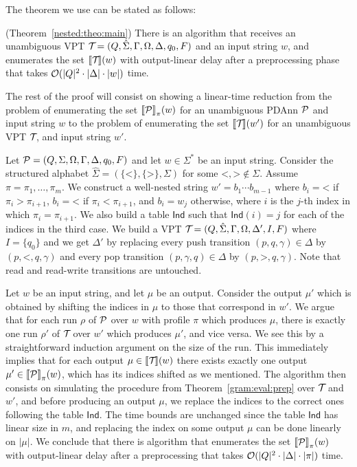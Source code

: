 The theorem we use can be stated as follows:

\begin{theorem}{(Theorem~\ref{nested:theo:main})}\label{gram:eval:prep}
	There is an algorithm that receives an unambiguous VPT $\mathcal{T}\! = (Q, \hat{\Sigma}, \Gamma, \Omega, \Delta, q_0, F)$ and an input string $w$, and enumerates the set ${\llbracket{\mathcal{T}\!}\rrbracket}(w)$ with output-linear delay after a preprocessing phase that takes $\mathcal{O}(|Q|^2 \cdot \vert\Delta\vert \cdot |w|)$ time.
\end{theorem}

The rest of the proof will consist on showing a linear-time reduction from the problem of enumerating the set ${\llbracket{\mathcal{P}}\rrbracket}_{\pi}(w)$ for an unambiguous PDAnn $\mathcal{P}$ and input string $w$ to the problem of enumerating the set ${\llbracket{\mathcal{T}\!}\rrbracket}(w')$ for an unambiguous VPT $\mathcal{T}\!$, and input string $w'$.

Let $\mathcal{P} = (Q, \Sigma, \Omega, \Gamma, \Delta, q_0, F)$ and let $w\in \Sigma^*$ be an input string.
Consider the structured alphabet $\hat{\Sigma} = (\{\texttt{<}\}, \{\texttt{>}\}, \Sigma)$ for some $\texttt{<}, \texttt{>}\not\in\Sigma$. Assume $\pi = \pi_1, \ldots, \pi_m$.
We construct a well-nested string $w' = b_1\cdots b_{m-1}$ where $b_i = 
\texttt{<}$ if $\pi_i > \pi_{i+1}$, $b_i = \texttt{<}$ if $\pi_i < \pi_{i+1}$, and $b_i  = w_j$ otherwise, where $i$ is the $j$-th index in which $\pi_i = \pi_{i+1}$.
We also build a table $\mathsf{Ind}$ such that $\mathsf{Ind}(i) = j$ for each of the indices in the third case.
We build a VPT $\mathcal{T}\! = (Q, \hat{\Sigma}, \Gamma, \Omega, \Delta', I, F)$ where $I = \{q_0\}$ and we get $\Delta'$ by replacing every push transition $(p, q, \gamma)\in \Delta$ by $(p, \texttt{<}, q, \gamma)$ and every pop transition $(p,\gamma,q)\in\Delta$ by $(p, \texttt{>}, q, \gamma)$. Note that read and read-write transitions are untouched.

Let $w$ be an input string, and let $\mu$ be an output. Consider the output $\mu'$ which is obtained by shifting the indices in $\mu$ to those that correspond in $w'$. We argue that for each run $\rho$ of $\mathcal{P}$ over $w$ with profile $\pi$ which produces $\mu$, there is exactly one run $\rho'$ of $\mathcal{T}\!$ over $w'$ which produces $\mu'$, and vice versa. We see this by a straightforward induction argument on the size of the run. This immediately implies that for each output $\mu\in{\llbracket{\mathcal{T}\!}\rrbracket}(w)$ there exists exactly one output $\mu'\in{\llbracket{\mathcal{P}}\rrbracket}_{\pi}(w)$, which has its indices shifted as we mentioned.
The algorithm then consists on simulating the procedure from Theorem~\ref{gram:eval:prep} over $\mathcal{T}\!$ and $w'$, and before producing an output $\mu$, we replace the indices to the correct ones following the table  $\mathsf{Ind}$. The time bounds are unchanged since the table $\mathsf{Ind}$ has linear size in $m$, and replacing the index on some output $\mu$ can be done linearly on $|\mu|$. We conclude that there is algorithm that enumerates the set ${\llbracket{\mathcal{P}}\rrbracket}_{\pi}(w)$ with output-linear delay after a preprocessing that takes $\mathcal{O}(|Q|^2\cdot \vert\Delta\vert\cdot |\pi|)$ time.
